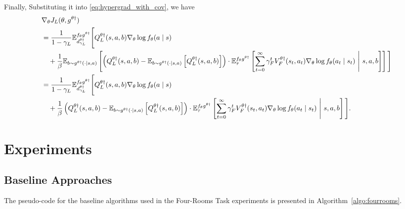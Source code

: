 \documentclass[letterpaper]{article} %
\providecommand{\E}{\mathbb{E}} %
\begin{document}
Finally, Substituting it into \eqref{eq:hypergrad_with_cov}, we have
\begin{subequations}
\begin{align}
    \MoveEqLeft[0]\nabla_{\theta}J_L(\theta,g^{\theta\dagger})\nonumber\\
    &\begin{multlined}[t]
        =\dfrac{1}{1-\gamma_L}\E_{d_{\gamma_L}^{\theta\dagger}}^{f_{\theta}g^{\theta \dagger}}\Bigg[Q_L^{\theta \dagger}(s,a,b)\nabla_{\theta}\log f_{\theta}(a\mid s)\\
        +\dfrac{1}{\beta}\E_{b\sim g^{\theta \dagger}(\cdot\mid s,a)}\left[\left(Q_L^{\theta \dagger}(s,a,b)
        -\E_{b\sim g^{\theta \dagger}(\cdot\mid s,a)}\left[Q_L^{\theta \dagger}(s,a,b)\right]\right)
        \cdot\E_\tau^{f_{\theta}g^{\theta \dagger}}\left[\sum_{t=0}^\infty\gamma_F^t V_F^{\theta\dagger}(s_t,a_t)\nabla_{\theta}\log f_{\theta}(a_t\mid s_t)~\middle|~s,a,b\right]\right]\Bigg]
    \end{multlined}\\
    &\begin{multlined}[t]
        =\dfrac{1}{1-\gamma_L}\E_{d_{\gamma_L}^{\theta\dagger}}^{f_{\theta}g^{\theta \dagger}}\Bigg[Q_L^{\theta \dagger}(s,a,b)\nabla_{\theta}\log f_{\theta}(a\mid s)\\
        +\dfrac{1}{\beta}\left(Q_L^{\theta \dagger}(s,a,b)
        -\E_{b\sim g^{\theta \dagger}(\cdot\mid s,a)}\left[Q_L^{\theta \dagger}(s,a,b)\right]\right)
        \cdot\E_\tau^{f_{\theta}g^{\theta \dagger}}\left[\sum_{t=0}^\infty\gamma_F^t V_F^{\theta\dagger}(s_t,a_t)\nabla_{\theta}\log f_{\theta}(a_t\mid s_t)~\middle|~s,a,b\right]\Bigg].
    \end{multlined}
\end{align}
\end{subequations}



\section{Experiments}

\subsection{Baseline Approaches}\label{apdx:baseline}

The pseudo-code for the baseline algorithms used in the Four-Rooms Task experiments is presented in Algorithm~\ref{algo:fourrooms}.
\end{document}

